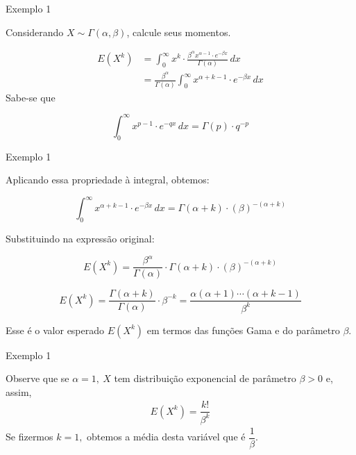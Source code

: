 \documentclass[12pt]{beamer}
\begin{document}
\begin{frame}{Exemplo 1}
	\begin{block}{}
		\justifying
		Considerando \( X \sim \Gamma(\alpha, \beta) \), calcule seus momentos.
		
		\begin{align*}
			E(X^k) &= \int_{0}^{\infty} x^k \cdot \frac{\beta^{\alpha}x^{\alpha-1} \cdot e^{-\beta x}}{\Gamma(\alpha)} \, dx \\
			&=\frac{\beta^{\alpha}}{\Gamma(\alpha)} \int_{0}^{\infty} x^{\alpha + k - 1} \cdot e^{-\beta x} \, dx
		\end{align*}
		Sabe-se que
		
		\[ \int_{0}^{\infty} x^{p-1} \cdot e^{-qx} \, dx = \Gamma(p) \cdot q^{-p} \]
		
	\end{block}
\end{frame}

\begin{frame}{Exemplo 1}
	\begin{block}{}
		\justifying
		Aplicando essa propriedade à integral, obtemos:
		
		\[ \int_{0}^{\infty} x^{\alpha + k - 1} \cdot e^{-\beta x} \, dx = \Gamma(\alpha + k) \cdot (\beta)^{-(\alpha + k)} \]
		
		Substituindo na expressão original:
		
		\[E(X^k) = \frac{\beta^{\alpha}}{\Gamma(\alpha)} \cdot \Gamma(\alpha + k) \cdot (\beta)^{-(\alpha + k)} \]
		
		\[E(X^k) = \frac{\Gamma(\alpha + k)}{\Gamma(\alpha)} \cdot \beta^{-k} = \dfrac{\alpha(\alpha+1)\cdots(\alpha+k-1)}{\beta^{k}}\]
		
		Esse é o valor esperado \(E(X^k)\) em termos das funções Gama e do parâmetro \(\beta\).
		
	\end{block}
\end{frame}

\begin{frame}{Exemplo 1}
	\begin{block}{}
		\justifying
		Observe que se $\alpha=1,~X$ tem distribuição exponencial de parâmetro $\beta>0$ e, assim, 
		\begin{align*}
			E(X^k) = \dfrac{k!}{\beta^{k}}   
		\end{align*}
		Se fizermos $k=1,$ obtemos a média desta variável que é $\dfrac{1}{\beta}.$
	\end{block}
\end{frame}
\end{document}
